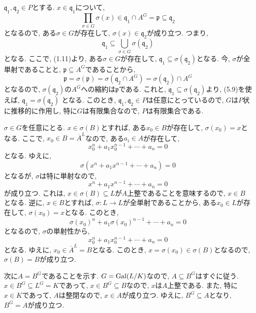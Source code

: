 \documentclass[dvipdfmx]{jsarticle}
\begin{document}
    \begin{problem}
        $\mathfrak{q}_1, \mathfrak{q}_2 \in P$とする.
        $x \in \mathfrak{q}_1$について,
        \[
            \prod_{\sigma \in G}\sigma(x) \in \mathfrak{q}_1 \cap A^G = \mathfrak{p} \subseteq \mathfrak{q}_2
        \]
        となるので,
        ある$\sigma \in G$が存在して, $\sigma(x) \in \mathfrak{q}_2$が成り立つ.
        つまり,
        \[
            \mathfrak{q}_1 \subseteq \bigcup_{\sigma \in G} \sigma(\mathfrak{q}_2)
        \]
        となる.
        ここで, (1.11)より, ある$\sigma \in G$が存在して,
        $\mathfrak{q}_1 \subseteq \sigma(\mathfrak{q}_2)$となる.
        今, $\sigma$が全単射であることと, $\mathfrak{p} \subseteq A^G$であることから,
        \[
            \mathfrak{p} = \sigma(\mathfrak{p}) = \sigma(\mathfrak{q}_2 \cap A^G) = \sigma(\mathfrak{q}_2) \cap A^G
        \]
        となるので, $\sigma(\mathfrak{q}_2)$の$A^G$への縮約は$\mathfrak{p}$である.
        これと, $\mathfrak{q}_1 \subseteq \sigma(\mathfrak{q}_2)$より,
        (5.9)を使えば, $\mathfrak{q}_1 = \sigma(\mathfrak{q}_2)$
        となる.
        このとき, $\mathfrak{q}_1, \mathfrak{q}_2 \in P$は任意にとっているので,
        $G$は$P$状に推移的に作用し,
        特に$G$は有限集合なので, $P$は有限集合である.
    \end{problem}

    \begin{problem}
        $\sigma \in G$を任意にとる.
        $x \in \sigma(B)$とすれば, ある$x_0 \in B$が存在して, $\sigma(x_0) = x$となる.
        ここで, $x_0 \in B  = \overline{A}^L$なので,
        ある$a_i \in A$が存在して,
        \[
            x_0^n + a_1 x_0^{n-1} + \cdots + a_n = 0
        \]
        となる.
        ゆえに,
        \[
            \sigma(x^n + a_1 x^{n-1} + \cdots + a_n) = 0
        \]
        となるが, $\sigma$は特に単射なので,
        \[
            x^n + a_1 x^{n-1} + \cdots + a_n = 0
        \]
        が成り立つ.
        これは, $x \in \sigma(B) \subseteq L$が$A$上整であることを意味するので,
        $x \in B$となる.
        逆に,
        $x \in B$とすれば, $\sigma: L \to L$が全単射であることから,
        ある$x_0 \in L$が存在して, $\sigma(x_0) = x$となる.
        このとき,
        \[
            \sigma(x_0)^n + a_1 \sigma(x_0)^{n-1} + \cdots + a_n = 0
        \]
        となるので, $\sigma$の単射性から,
        \[
            x^n_0 + a_1 x^{n-1}_0 + \cdots + a_n = 0
        \]
        となる.
        ゆえに, $x_0 \in \overline{A}^L = B$となる.
        このとき, $x = \sigma(x_0) \in \sigma(B)$となるので, $\sigma(B) = B$が成り立つ.

        次に$A = B^G$であることを示す.
        $G = \operatorname{Gal}(L/K)$なので, $A \subseteq B^G$はすぐに従う.
        $x \in B^G \subseteq L^G = K$であって,
        $x \in B^G \subseteq B$なので, $x$は$A$上整である.
        また, 特に$x \in K$であって, $A$は整閉なので, $x \in A$が成り立つ.
        ゆえに, $B^G \subseteq A$となり, $B^G = A$が成り立つ.
    \end{problem}
\end{document}
